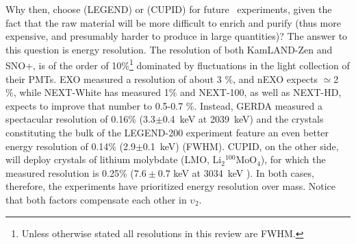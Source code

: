 Why then, choose  (LEGEND) or  (CUPID) for future \bbonu\ experiments, given the fact that the raw material will be more difficult to enrich and purify (thus more expensive, and presumably harder to produce in large quantities)? %
%
The answer to this question is energy resolution. The resolution of both KamLAND-Zen and SNO+, is of the order of 10\%\footnote{Unless otherwise stated all resolutions in this review are FWHM.} dominated by fluctuations in the light collection of their PMTs. EXO measured a resolution of about 3 \%, and nEXO expects $\simeq$2 \%, while NEXT-White has measured 1\% and NEXT-100, as well as NEXT-HD, expects to improve that number to 0.5-0.7 \%. Instead, 
GERDA measured a spectacular resolution of 0.16\% (3.3$\pm$0.4~keV at 2039~keV\cite{GERDA:2020xhi}) and the crystals constituting the bulk of the LEGEND-200 experiment feature an even better energy resolution of 0.14\% (2.9$\pm$0.1~keV)  (FWHM). CUPID, on the other side, will deploy crystals of 
lithium molybdate (LMO, Li$_2$$^{100}$MoO$_4$), for which the measured resolution is 0.25\% ($7.6 \pm 0.7$ keV at  3034~keV \cite{CUPID:2020aow}). In both cases, therefore, the experiments have prioritized energy resolution over mass. Notice that both factors compensate each other in $\upsilon_2$. 






